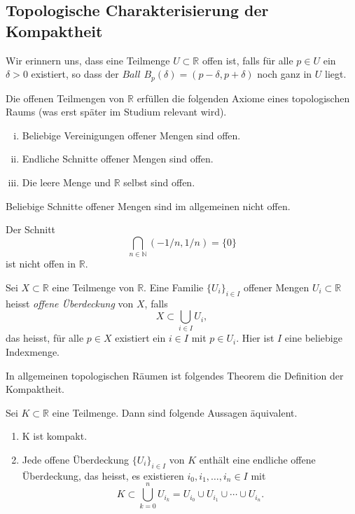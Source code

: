 \documentclass[../main.tex]{subfiles}
\begin{document}
\subsection*{Topologische Charakterisierung
der Kompaktheit}
Wir erinnern uns, dass eine Teilmenge
$U \subset \mathbb{R}$ offen ist,
falls für alle
$p \in U$ ein $\delta > 0$ existiert,
so dass der $\textit{Ball}$ 
$B_p(\delta) = (p- \delta, p + \delta)$
noch ganz in $U$ liegt.

\begin{remark}
  Die offenen Teilmengen von $\mathbb{R}$ 
  erfüllen die folgenden Axiome
  eines topologischen Raums (was
  erst später im Studium relevant wird).
  \begin{enumerate}[(i)]
    \item Beliebige Vereinigungen
      offener Mengen sind offen.
    \item Endliche Schnitte offener
      Mengen sind offen.
    \item Die leere Menge und $\mathbb{R}$ selbst
      sind offen.
  \end{enumerate}
\end{remark}

\begin{warning}
  Beliebige Schnitte offener Mengen sind
  im allgemeinen
  nicht offen. 
\end{warning}

\begin{example}
  Der Schnitt
  \[
    \bigcap_{n \in \mathbb{N}} (-1/n, 1/n) = \{0\}
  \]
  ist nicht offen in $\mathbb{R}$.
\end{example}

\begin{definition}
Sei $X \subset \mathbb{R}$ eine
Teilmenge von $\mathbb{R}$.
Eine Familie ${\{U_i\}}_{i \in I}$ 
offener Mengen $U_i \subset \mathbb{R}$
heisst \emph{offene Überdeckung}
von $X$, falls
\[
  X \subset \bigcup_{i \in I} U_i,
\]
das heisst, für alle  $p \in X$ 
existiert ein $i \in I$ 
mit $p \in U_i$.
Hier ist $I$ eine
beliebige Indexmenge.
\end{definition}

In allgemeinen topologischen Räumen
ist folgendes Theorem 
die Definition der Kompaktheit.

\begin{theorem}\label{thm:heine-borel}
  Sei $K \subset \mathbb{R}$ eine Teilmenge.
  Dann sind folgende Aussagen äquivalent.
  \begin{enumerate}[\normalfont(i)]
    \item K ist kompakt.
    \item Jede offene Überdeckung ${\{U_i\}}_{i \in I}$ 
      von $K$ enthält eine endliche offene Überdeckung,
      das heisst, es existieren
      $i_0,i_1, \dots, i_n \in I$ mit
      \[
        K \subset \bigcup_{k = 0}^n U_{i_k}
        = U_{i_0} \cup U_{i_1} \cup \cdots
        \cup U_{i_n}.
      \]
  \end{enumerate}
\end{theorem}
\end{document}
